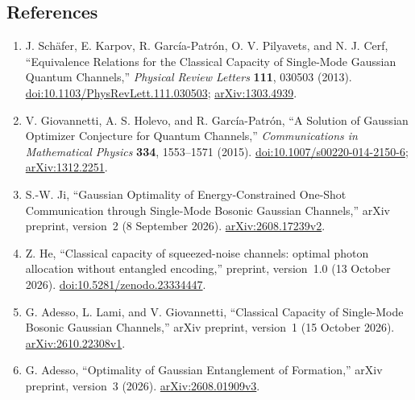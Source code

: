 \subsection*{References}

\begin{enumerate}[label={},leftmargin=4.8em,labelsep=0.5em]
  \footnotesize
  \item[\textup{[SKG+13]}]\label{ref:ps-equivalence}
  J. Sch\"afer, E. Karpov, R. Garc\'ia-Patr\'on, O. V. Pilyavets, and N. J. Cerf, ``Equivalence Relations for the Classical Capacity of Single-Mode Gaussian Quantum Channels,'' \emph{Physical Review Letters} \textbf{111}, 030503 (2013). \href{https://doi.org/10.1103/PhysRevLett.111.030503}{doi:10.1103/PhysRevLett.111.030503}; \href{https://arxiv.org/abs/1303.4939}{arXiv:1303.4939}.

  \item[\textup{[GHG15]}]\label{ref:ps-optimizer}
  V. Giovannetti, A. S. Holevo, and R. Garc\'ia-Patr\'on, ``A Solution of Gaussian Optimizer Conjecture for Quantum Channels,'' \emph{Communications in Mathematical Physics} \textbf{334}, 1553--1571 (2015). \href{https://doi.org/10.1007/s00220-014-2150-6}{doi:10.1007/s00220-014-2150-6}; \href{https://arxiv.org/abs/1312.2251}{arXiv:1312.2251}.

  \item[\textup{[Ji26]}]\label{ref:ps-ji}
  S.-W. Ji, ``Gaussian Optimality of Energy-Constrained One-Shot Communication through Single-Mode Bosonic Gaussian Channels,'' arXiv preprint, version~2 (8 September 2026). \href{https://arxiv.org/abs/2608.17239v2}{arXiv:2608.17239v2}.

  \item[\textup{[He26]}]\label{ref:ps-he}
  Z. He, ``Classical capacity of squeezed-noise channels: optimal photon allocation without entangled encoding,'' preprint, version~1.0 (13 October 2026). \href{https://doi.org/10.5281/zenodo.23334447}{doi:10.5281/zenodo.23334447}.

  \item[\textup{[ALG26]}]\label{ref:ps-alg}
  G. Adesso, L. Lami, and V. Giovannetti, ``Classical Capacity of Single-Mode Bosonic Gaussian Channels,'' arXiv preprint, version~1 (15 October 2026). \href{https://arxiv.org/abs/2610.22308v1}{arXiv:2610.22308v1}.

  \item[\textup{[Ade26]}]\label{ref:ps-adesso-epr}
  G. Adesso, ``Optimality of Gaussian Entanglement of Formation,'' arXiv preprint, version~3 (2026). \href{https://arxiv.org/abs/2608.01909v3}{arXiv:2608.01909v3}.
\end{enumerate}

